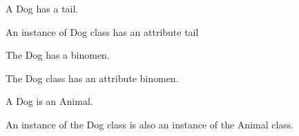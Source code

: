 \begin{DoxyItemize}
\item A {\ttfamily Dog} has a {\ttfamily tail}.
\begin{DoxyItemize}
\item An instance of {\ttfamily Dog} class has an attribute {\ttfamily tail}
\end{DoxyItemize}
\item The {\ttfamily Dog} has a {\ttfamily binomen}.
\begin{DoxyItemize}
\item The {\ttfamily Dog} class has an attribute {\ttfamily binomen}.
\end{DoxyItemize}
\item A {\ttfamily Dog} is an {\ttfamily Animal}.
\begin{DoxyItemize}
\item An instance of the {\ttfamily Dog} class is also an instance of the {\ttfamily Animal} class. 
\end{DoxyItemize}
\end{DoxyItemize}